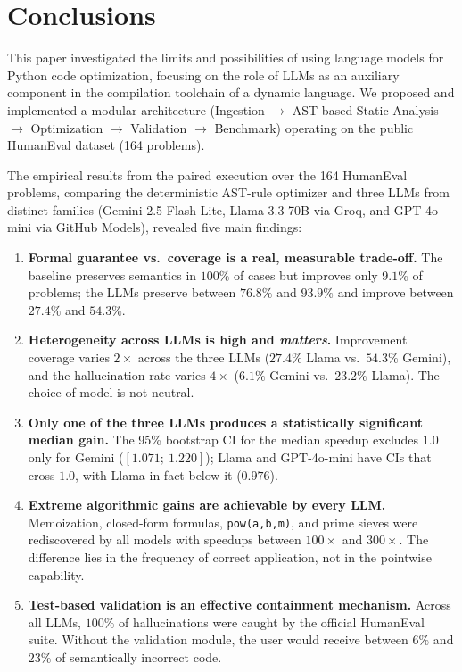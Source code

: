\documentclass[conference]{IEEEtran}
\begin{document}
\section{Conclusions}
\label{sec:conclusao}

This paper investigated the limits and possibilities of using language models for Python code optimization, focusing on the role of LLMs as an auxiliary component in the compilation toolchain of a dynamic language. We proposed and implemented a modular architecture (Ingestion $\rightarrow$ AST-based Static Analysis $\rightarrow$ Optimization $\rightarrow$ Validation $\rightarrow$ Benchmark) operating on the public HumanEval dataset (164 problems).

The empirical results from the paired execution over the 164 HumanEval problems, comparing the deterministic AST-rule optimizer and three LLMs from distinct families (Gemini 2.5 Flash Lite, Llama 3.3 70B via Groq, and GPT-4o-mini via GitHub Models), revealed five main findings:

\begin{enumerate}
\item \textbf{Formal guarantee vs.\ coverage is a real, measurable trade-off.} The baseline preserves semantics in $100\%$ of cases but improves only $9.1\%$ of problems; the LLMs preserve between $76.8\%$ and $93.9\%$ and improve between $27.4\%$ and $54.3\%$.

\item \textbf{Heterogeneity across LLMs is high and \emph{matters}.} Improvement coverage varies $2\times$ across the three LLMs ($27.4\%$ Llama vs.\ $54.3\%$ Gemini), and the hallucination rate varies $4\times$ ($6.1\%$ Gemini vs.\ $23.2\%$ Llama). The choice of model is not neutral.

\item \textbf{Only one of the three LLMs produces a statistically significant median gain.} The 95\% bootstrap CI for the median speedup excludes $1.0$ only for Gemini ($[1.071;~1.220]$); Llama and GPT-4o-mini have CIs that cross $1.0$, with Llama in fact below it ($0.976$).

\item \textbf{Extreme algorithmic gains are achievable by every LLM.} Memoization, closed-form formulas, \texttt{pow(a,b,m)}, and prime sieves were rediscovered by all models with speedups between $100\times$ and $300\times$. The difference lies in the frequency of correct application, not in the pointwise capability.

\item \textbf{Test-based validation is an effective containment mechanism.} Across all LLMs, $100\%$ of hallucinations were caught by the official HumanEval suite. Without the validation module, the user would receive between $6\%$ and $23\%$ of semantically incorrect code.
\end{enumerate}
\end{document}
